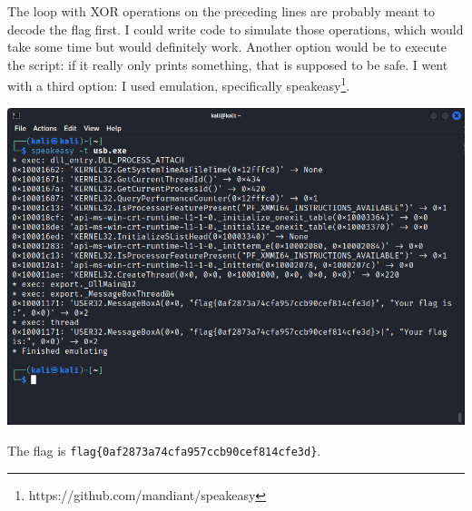 \documentclass{article}
\begin{document}
\noindent
The loop with XOR operations on the preceding lines are probably meant to decode the flag first. I could write code to simulate those operations, which would take some time but would definitely work. Another option would be to execute the script: if it really only prints something, that is supposed to be safe. I went with a third option: I used emulation, specifically speakeasy\footnote{https://github.com/mandiant/speakeasy}.

\noindent 
\begin{center}
\includegraphics[width=16cm]{usb-drive/screenshot6.png}
\end{center}

\noindent
The flag is \texttt{flag\{0af2873a74cfa957ccb90cef814cfe3d\}}.
\end{document}
